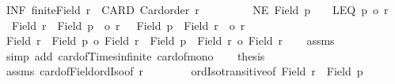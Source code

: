 \begin{isabellebody}
\ INF{\isacharcolon}{\kern0pt}\ {\isachardoublequoteopen}{\isasymnot}finite{\isacharparenleft}{\kern0pt}Field\ r{\isacharparenright}{\kern0pt}{\isachardoublequoteclose}\ \ CARD{\isacharcolon}{\kern0pt}\ {\isachardoublequoteopen}Card{\isacharunderscore}{\kern0pt}order\ r{\isachardoublequoteclose}\ \isanewline
\ \ \ \ \ \ \ \ NE{\isacharcolon}{\kern0pt}\ {\isachardoublequoteopen}Field\ p\ {\isasymnoteq}\ {\isacharbraceleft}{\kern0pt}{\isacharbraceright}{\kern0pt}{\isachardoublequoteclose}\ \ LEQ{\isacharcolon}{\kern0pt}\ {\isachardoublequoteopen}p\ {\isasymle}o\ r{\isachardoublequoteclose}\isanewline
{}\ {\isachardoublequoteopen}{\isacharbar}{\kern0pt}\ {\isacharparenleft}{\kern0pt}Field\ r{\isacharparenright}{\kern0pt}\ {\isasymtimes}\ {\isacharparenleft}{\kern0pt}Field\ p{\isacharparenright}{\kern0pt}\ {\isacharbar}{\kern0pt}\ {\isacharequal}{\kern0pt}o\ r\ {\isasymand}\ {\isacharbar}{\kern0pt}\ {\isacharparenleft}{\kern0pt}Field\ p{\isacharparenright}{\kern0pt}\ {\isasymtimes}\ {\isacharparenleft}{\kern0pt}Field\ r{\isacharparenright}{\kern0pt}\ {\isacharbar}{\kern0pt}\ {\isacharequal}{\kern0pt}o\ r{\isachardoublequoteclose}\isanewline
%
\isadelimproof
%
\endisadelimproof
%
\isatagproof
{}\isamarkupfalse%
{\isacharminus}{\kern0pt}\isanewline
\ \ \isamarkupfalse%
\ {\isachardoublequoteopen}{\isacharbar}{\kern0pt}Field\ r\ {\isasymtimes}\ Field\ p{\isacharbar}{\kern0pt}\ {\isacharequal}{\kern0pt}o\ {\isacharbar}{\kern0pt}Field\ r{\isacharbar}{\kern0pt}\ {\isasymand}\ {\isacharbar}{\kern0pt}Field\ p\ {\isasymtimes}\ Field\ r{\isacharbar}{\kern0pt}\ {\isacharequal}{\kern0pt}o\ {\isacharbar}{\kern0pt}Field\ r{\isacharbar}{\kern0pt}{\isachardoublequoteclose}\isanewline
\ \ \isamarkupfalse%
\ assms\ \isamarkupfalse%
\ {\isacharparenleft}{\kern0pt}simp\ add{\isacharcolon}{\kern0pt}\ card{\isacharunderscore}{\kern0pt}of{\isacharunderscore}{\kern0pt}Times{\isacharunderscore}{\kern0pt}infinite\ card{\isacharunderscore}{\kern0pt}of{\isacharunderscore}{\kern0pt}mono{}{\isacharparenright}{\kern0pt}\isanewline
\ \ \isamarkupfalse%
\ {\isacharquery}{\kern0pt}thesis\isanewline
\ \ \isamarkupfalse%
\ assms\ card{\isacharunderscore}{\kern0pt}of{\isacharunderscore}{\kern0pt}Field{\isacharunderscore}{\kern0pt}ordIso{\isacharbrackleft}{\kern0pt}of\ r{\isacharbrackright}{\kern0pt}\isanewline
\ \ \ \ \ \ \ \ ordIso{\isacharunderscore}{\kern0pt}transitive{\isacharbrackleft}{\kern0pt}of\ {\isachardoublequoteopen}{\isacharbar}{\kern0pt}Field\ r\ {\isasymtimes}\ Field\ p{\isacharbar}{\kern0pt}{\isachardoublequoteclose}{\isacharbrackright}{\kern0pt}\isanewline

\end{isabellebody}
